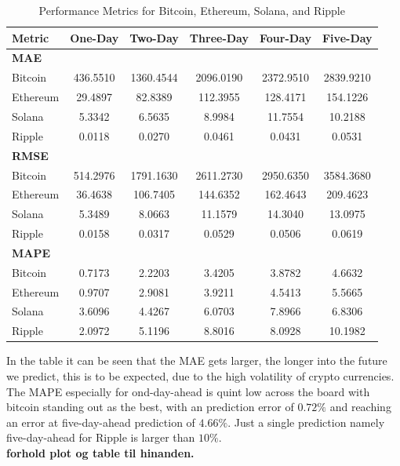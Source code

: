 \begin{table}[H]
\centering
\caption{Performance Metrics for Bitcoin, Ethereum, Solana, and Ripple}
\begin{tabular}{lccccc}
\toprule
\textbf{Metric} & \textbf{One-Day} & \textbf{Two-Day} & \textbf{Three-Day} & \textbf{Four-Day} & \textbf{Five-Day} \\
\midrule
\textbf{MAE} & & & & & \\
Bitcoin   & 436.5510 & 1360.4544 & 2096.0190 & 2372.9510 & 2839.9210 \\
Ethereum  &  29.4897 &   82.8389 &  112.3955 &  128.4171 &  154.1226 \\
Solana    &   5.3342 &    6.5635 &    8.9984 &   11.7554 &   10.2188 \\
Ripple    &   0.0118 &    0.0270 &    0.0461 &    0.0431 &    0.0531 \\
\midrule
\textbf{RMSE} & & & & & \\
Bitcoin   & 514.2976 & 1791.1630 & 2611.2730 & 2950.6350 & 3584.3680 \\
Ethereum  &  36.4638 &  106.7405 &  144.6352 &  162.4643 &  209.4623 \\
Solana    &   5.3489 &    8.0663 &   11.1579 &   14.3040 &   13.0975 \\
Ripple    &   0.0158 &    0.0317 &    0.0529 &    0.0506 &    0.0619 \\
\midrule
\textbf{MAPE} & & & & & \\
Bitcoin   &   0.7173 &    2.2203 &    3.4205 &    3.8782 &    4.6632 \\
Ethereum  &   0.9707 &    2.9081 &    3.9211 &    4.5413 &    5.5665 \\
Solana    &   3.6096 &    4.4267 &    6.0703 &    7.8966 &    6.8306 \\
Ripple    &   2.0972 &    5.1196 &    8.8016 &    8.0928 &   10.1982 \\
\bottomrule
\end{tabular}
\end{table}
\noindent In the table it can be seen that the MAE gets larger, the longer into the future we predict, this is to be expected, due to the high volatility of crypto currencies. The MAPE especially for ond-day-ahead is quint low across the board with bitcoin standing out as the best, with an prediction error of $0.72\%$ and reaching an error at five-day-ahead prediction of $4.66\%$. Just a single prediction namely five-day-ahead for Ripple is larger than $10\%$.\\
\textbf{forhold plot og table til hinanden.}